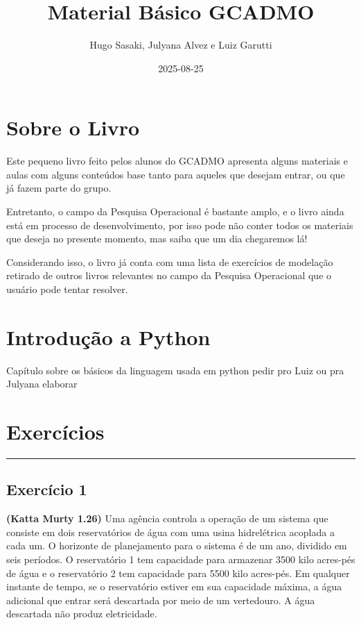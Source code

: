 \documentclass[
]{book}
\title{Material Básico GCADMO}
\author{Hugo Sasaki, Julyana Alvez e Luiz Garutti}
\date{2025-08-25}
\begin{document}
\maketitle

{
\setcounter{tocdepth}{1}
\tableofcontents
}
\chapter*{Sobre o Livro}\label{sobre-o-livro}

Este pequeno livro feito pelos alunos do GCADMO apresenta alguns materiais e aulas com alguns conteúdos base tanto para aqueles que desejam entrar, ou que já fazem parte do grupo.

Entretanto, o campo da Pesquisa Operacional é bastante amplo, e o livro ainda está em processo de desenvolvimento, por isso pode não conter todos os materiais que deseja no presente momento, mas saiba que um dia chegaremos lá!

Considerando isso, o livro já conta com uma lista de exercícios de modelação retirado de outros livros relevantes no campo da Pesquisa Operacional que o usuário pode tentar resolver.

\chapter*{Introdução a Python}\label{introduuxe7uxe3o-a-python}

Capítulo sobre os básicos da linguagem usada em python pedir pro Luiz ou pra Julyana elaborar

\chapter*{Exercícios}\label{exercuxedcios}

\begin{center}\rule{0.5\linewidth}{0.5pt}\end{center}

\section*{Exercício 1}\label{exercuxedcio-1}

\textbf{(Katta Murty 1.26)} Uma agência controla a operação de um sistema que consiste em dois reservatórios de água com uma usina hidrelétrica acoplada a cada um. O horizonte de planejamento para o sistema é de um ano, dividido em seis períodos. O reservatório 1 tem capacidade para armazenar 3500 kilo acres-pés de água e o reservatório 2 tem capacidade para 5500 kilo acres-pés. Em qualquer instante de tempo, se o reservatório estiver em sua capacidade máxima, a água adicional que entrar será descartada por meio de um vertedouro. A água descartada não produz eletricidade.
\end{document}
